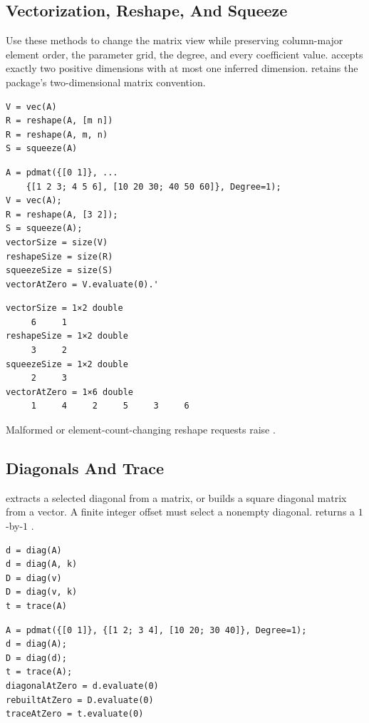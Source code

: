 \subsection{Vectorization, Reshape, And Squeeze}

Use these methods to change the matrix view while preserving column-major element order, the parameter grid, the degree, and every coefficient value.  accepts exactly two positive dimensions with at most one inferred \code{[]} dimension.   retains the package's two-dimensional matrix convention.

\syntaxhead
\begin{lstlisting}[style=dpsyntax]
V = vec(A)
R = reshape(A, [m n])
R = reshape(A, m, n)
S = squeeze(A)
\end{lstlisting}

\examplehead
\begin{lstlisting}[style=dpmatlab]
A = pdmat({[0 1]}, ...
    {[1 2 3; 4 5 6], [10 20 30; 40 50 60]}, Degree=1);
V = vec(A);
R = reshape(A, [3 2]);
S = squeeze(A);
vectorSize = size(V)
reshapeSize = size(R)
squeezeSize = size(S)
vectorAtZero = V.evaluate(0).'
\end{lstlisting}

\begin{lstlisting}[style=dpoutput]
vectorSize = 1×2 double
     6     1
reshapeSize = 1×2 double
     3     2
squeezeSize = 1×2 double
     2     3
vectorAtZero = 1×6 double
     1     4     2     5     3     6
\end{lstlisting}

Malformed or element-count-changing reshape requests raise .

\subsection{Diagonals And Trace}

 extracts a selected diagonal from a matrix, or builds a square diagonal matrix from a vector. A finite integer offset  must select a nonempty diagonal.  returns a $1$-by-$1$ .

\syntaxhead
\begin{lstlisting}[style=dpsyntax]
d = diag(A)
d = diag(A, k)
D = diag(v)
D = diag(v, k)
t = trace(A)
\end{lstlisting}

\examplehead
\begin{lstlisting}[style=dpmatlab]
A = pdmat({[0 1]}, {[1 2; 3 4], [10 20; 30 40]}, Degree=1);
d = diag(A);
D = diag(d);
t = trace(A);
diagonalAtZero = d.evaluate(0)
rebuiltAtZero = D.evaluate(0)
traceAtZero = t.evaluate(0)
\end{lstlisting}

